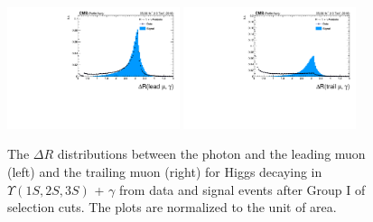 \begin{figure}[!htbp]
\begin{center}
\includegraphics[width=0.45\textwidth]{figures_and_tables/outputPlots/HtoUpsilon_Cat0_ZZZZZ/au/data_x_mc/noKinCuts/h_noKin_deltaR_Leading_Photon}\hspace*{1.cm}
\includegraphics[width=0.45\textwidth]{figures_and_tables/outputPlots/HtoUpsilon_Cat0_ZZZZZ/au/data_x_mc/noKinCuts/h_noKin_deltaR_Trailing_Photon}\end{center}\vspace*{-.5cm}
\caption{The $\Delta R$ distributions between the photon and the leading muon (left) and the trailing muon (right) for Higgs decaying in $\Upsilon(1S,2S,3S)$ + $\gamma$ from data and signal events after Group I of selection cuts. The plots are normalized to the unit of area.}
\label{fig:deltaR_HtoUpsilon_Cat0}
\end{figure}

